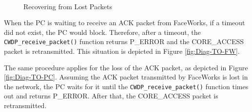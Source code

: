 \documentclass[defaultstyle,10pt,master,Helvetica]{thesis}
\begin{document}
\begin{figure}[h]
\\
\caption{Recovering from Lost Packets}
\label{fig:DIAG}
\end{figure}

When the PC is waiting to receive an \ac{ACK} packet from FaceWorks, if a timeout did not exist, the PC would block. Therefore, after a timeout, the \texttt{CWDP\_receive\_packet()} function returns P\_ERROR and the CORE\_ACCESS packet is retransmitted. This situation is depicted in Figure \ref{fig:Diag-TO-FW}.

The same procedure applies for the loss of the \ac{ACK} packet, as depicted in Figure \ref{fig:Diag-TO-PC}. Assuming the \ac{ACK} packet transmitted by FaceWorks is lost in the network, the PC waits for it until the \texttt{CWDP\_receive\_packet()} function times out and returns P\_ERROR. After that, the CORE\_ACCESS packet is retransmitted.
\end{document}
